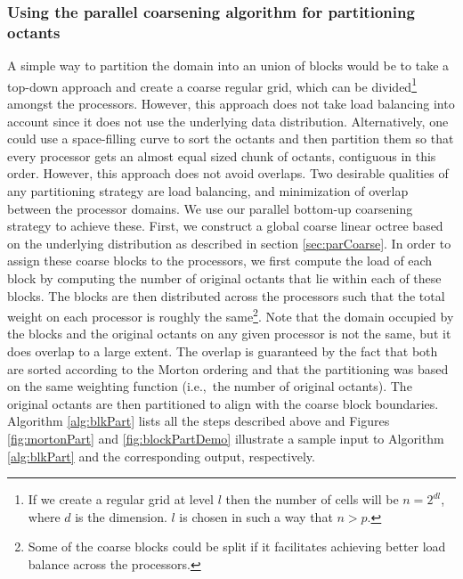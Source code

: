 \subsubsection{Using the parallel coarsening algorithm for partitioning octants}
\label{sec:blkPart}
A simple way to partition the domain into an union of blocks would be
to take a top-down approach and create a coarse regular grid, which
can be divided\footnote{If we create a regular grid at level $l$ then
the number of cells will be $n = 2^{dl}$, where $d$ is the
dimension. $l$ is chosen in such a way that $n>p$.} amongst the
processors. However, this approach does not take load balancing into
account since it does not use the underlying data
distribution. Alternatively, one could use a space-filling curve to
sort the octants and then partition them so that every processor gets
an almost equal sized chunk of octants, contiguous in this
order. However, this approach does not avoid overlaps. Two desirable
qualities of any partitioning strategy are load balancing, and
minimization of overlap between the processor domains. We use our
parallel bottom-up coarsening strategy to achieve these. First, we
construct a global coarse linear octree based on the underlying
distribution as described in section \ref{sec:parCoarse}. In order to
assign these coarse blocks to the processors, we first compute the
load of each block by computing the number of original octants that
lie within each of these blocks. The blocks are then distributed
across the processors such that the total weight on each processor is
roughly the same\footnote{Some of the coarse blocks could be split if
it facilitates achieving better load balance across the
processors.}. Note that the domain occupied by the blocks and the
original octants on any given processor is not the same, but it does
overlap to a large extent. The overlap is guaranteed by the fact that
both are sorted according to the Morton ordering and that the
partitioning was based on the same weighting function (i.e.,\, the
number of original octants). The original octants are then partitioned
to align with the coarse block boundaries. Algorithm \ref{alg:blkPart}
lists all the steps described above and Figures \ref{fig:mortonPart}
and \ref{fig:blockPartDemo} illustrate a sample input to Algorithm
\ref{alg:blkPart} and the corresponding output, respectively.

